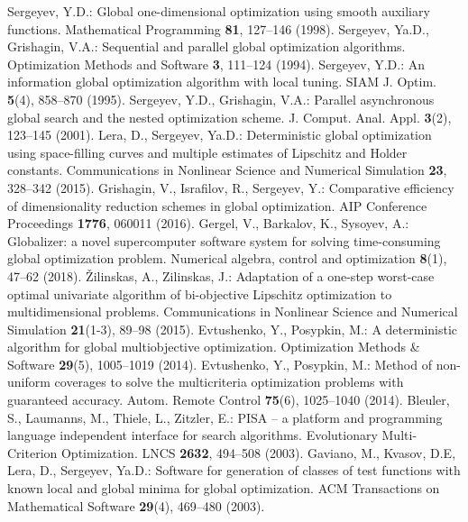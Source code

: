 \documentclass[runningheads]{llncs}
\begin{document}
\begin{thebibliography}{1}
 Sergeyev, Y.D.: Global one-dimensional optimization using smooth auxiliary functions. Mathematical Programming \textbf{81}, 127--146 (1998).
 Sergeyev, Ya.D., Grishagin, V.A.: Sequential and parallel global optimization algorithms. Optimization Methods and Software \textbf{3}, 111--124 (1994).
 Sergeyev, Y.D.: An information global optimization algorithm with local tuning. SIAM J. Optim. \textbf{5}(4), 858--870 (1995).
 Sergeyev, Y.D., Grishagin, V.A.: Parallel asynchronous global search and the nested optimization scheme. J. Comput. Anal. Appl. \textbf{3}(2), 123--145 (2001).
 Lera, D., Sergeyev, Ya.D.: Deterministic global optimization using space-filling curves and multiple estimates of Lipschitz and Holder constants. Communications in Nonlinear Science and Numerical Simulation \textbf{23}, 328--342 (2015).
 Grishagin, V., Israfilov, R., Sergeyev, Y.: Comparative efficiency of dimensionality reduction schemes in global optimization. AIP Conference Proceedings \textbf{1776}, 060011 (2016).
 Gergel, V., Barkalov, K., Sysoyev, A.: Globalizer: a novel supercomputer software system for solving time-consuming global optimization problem. Numerical algebra, control and optimization \textbf{8}(1), 47--62 (2018).
 {\v Z}ilinskas, A., Zilinskas, J.: Adaptation of a one-step worst-case optimal univariate algorithm of bi-objective Lipschitz optimization to multidimensional problems. Communications in Nonlinear Science and Numerical Simulation \textbf{21}(1-3), 89--98 (2015). 
 Evtushenko, Y., Posypkin, M.: A deterministic algorithm for global multiobjective optimization. Optimization Methods \& Software \textbf{29}(5), 1005--1019 (2014). 
 Evtushenko, Y., Posypkin, M.: Method of non-uniform coverages to solve the multicriteria optimization problems with guaranteed accuracy. Autom. Remote Control \textbf{75}(6), 1025--1040 (2014).
 Bleuler, S., Laumanns, M., Thiele, L., Zitzler, E.: PISA -- a platform and programming language independent interface for search algorithms. Evolutionary Multi-Criterion Optimization. LNCS \textbf{2632}, 494--508 (2003). 
 Gaviano, M., Kvasov, D.E, Lera, D., Sergeyev, Ya.D.: Software for generation of classes of test functions with known local and global minima for global optimization. ACM Transactions on Mathematical Software \textbf{29}(4), 469--480 (2003).


\end{thebibliography}


%
\end{document}
